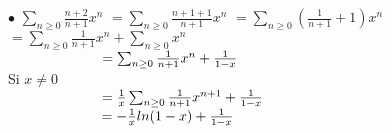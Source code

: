 \documentclass{article}
\newcommand\tab[1][1cm]{\hspace*{#1}}
\begin{document}
\noindent $\bullet$ $\sum_{n\geq 0} \frac{n + 2}{n + 1}x^n$
$= \sum_{n\geq 0} \frac{n + 1 + 1}{n + 1}x^n$
$= \sum_{n\geq 0} (\frac{1}{n + 1} + 1)x^n $
$= \sum_{n\geq 0} \frac{1}{n + 1}x^n  +\sum_{n\geq 0} x^n$\\
$\tab[2.35cm] = \sum_{n\geq 0} \frac{1}{n + 1}x^n  + \frac{1}{1-x}$\\
Si $x \neq 0$\\ 
$\tab[2.35cm] = \frac{1}{x}\sum_{n\geq 0} \frac{1}{n + 1}x^{n +1}  + \frac{1}{1-x}$\\
$\tab[2.35cm] = -\frac{1}{x} ln(1 - x)  + \frac{1}{1-x}$
\end{document}
